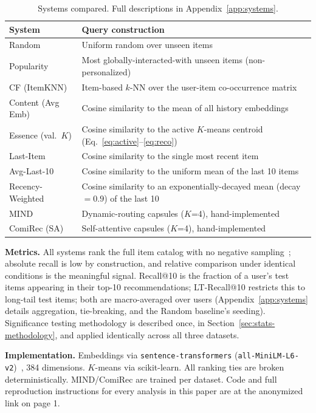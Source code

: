 \documentclass{article}
\begin{document}
\begin{table}[t]
\centering
\caption{Systems compared. Full descriptions in Appendix~\ref{app:systems}.}
\label{tab:systems}
\small
\begin{tabular}{ll}
\toprule
\textbf{System} & \textbf{Query construction} \\
\midrule
Random & Uniform random over unseen items \\
Popularity & Most globally-interacted-with unseen items (non-personalized) \\
CF (ItemKNN) & Item-based $k$-NN over the user-item co-occurrence matrix \\
Content (Avg Emb) & Cosine similarity to the mean of all history embeddings \\
Essence (val.\ $K$) & Cosine similarity to the active $K$-means centroid (Eq.~\ref{eq:active}--\ref{eq:reco}) \\
Last-Item & Cosine similarity to the single most recent item \\
Avg-Last-10 & Cosine similarity to the uniform mean of the last 10 items \\
Recency-Weighted & Cosine similarity to an exponentially-decayed mean (decay $=0.9$) of the last 10 \\
MIND & Dynamic-routing capsules ($K$=4), hand-implemented~\cite{li2019} \\
ComiRec (SA) & Self-attentive capsules ($K$=4), hand-implemented~\cite{cen2020} \\
\bottomrule
\end{tabular}
\end{table}

\textbf{Metrics.} All systems rank the full item catalog with no negative sampling~\cite{krichene2020,rendle2019}; absolute recall is low by construction, and relative comparison under identical conditions is the meaningful signal. Recall@10 is the fraction of a user's test items appearing in their top-10 recommendations; LT-Recall@10 restricts this to long-tail test items; both are macro-averaged over users (Appendix~\ref{app:systems} details aggregation, tie-breaking, and the Random baseline's seeding). Significance testing methodology is described once, in Section~\ref{sec:stats-methodology}, and applied identically across all three datasets.

\textbf{Implementation.} Embeddings via \texttt{sentence-transformers} (\texttt{all-MiniLM-L6-v2})~\cite{reimers2019,wang2020}, 384 dimensions. $K$-means via scikit-learn. All ranking ties are broken deterministically. MIND/ComiRec are trained per dataset. Code and full reproduction instructions for every analysis in this paper are at the anonymized link on page 1.
\end{document}
